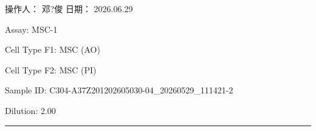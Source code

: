 \documentclass[UTF8,10pt,a4paper,fontset=fandol]{ctexart}
\newcommand{\fieldvalue}[1]{#1}
\newcommand{\handwritten}[1]{#1}
\begin{document}
\noindent
\begin{center}
\begin{minipage}[t]{0.43\linewidth}
\centering
{}
\end{minipage}
\hfill
\begin{minipage}[t]{0.43\linewidth}
\centering
{}
\end{minipage}

\vspace{0.5cm}

\begin{minipage}[t]{0.43\linewidth}
\centering
{}
\end{minipage}
\hfill
\begin{minipage}[t]{0.43\linewidth}
\centering
{}
\end{minipage}
\end{center}

\vfill

\noindent
操作人：
\fieldvalue{\handwritten{邓?俊}}
\hfill
日期：
\fieldvalue{\handwritten{2026.06.29}}

\newpage

Assay: 
\fieldvalue{MSC-1}

\medskip
Cell Type F1: 
\fieldvalue{MSC (AO)}

\par
Cell Type F2: 
\fieldvalue{MSC (PI)}

\medskip
Sample ID: 
\fieldvalue{C304-A37Z201202605030-04\_20260529\_111421-2}

\par
Dilution: 
\fieldvalue{2.00}

\bigskip
\noindent\rule{\linewidth}{0.4pt}
\end{document}
